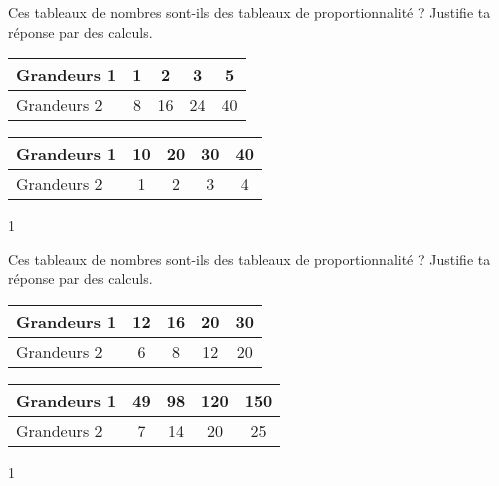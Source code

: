 \documentclass[a4paper,11pt]{report}
\begin{document}
\begin{exo}{
Ces tableaux de nombres sont-ils des tableaux de proportionnalité ? Justifie ta réponse par des calculs.

\begin{tasks}
\task 
\begin{tabular}{|l|c|c|c|c|}\hline
Grandeurs 1 & 1 & 2 & 3 & 5 \\\hline
Grandeurs 2 & 8 & 16 & 24 & 40 \\\hline
\end{tabular}
\task 
\begin{tabular}{|l|c|c|c|c|}\hline
Grandeurs 1 & 10 & 20 & 30 & 40 \\\hline
Grandeurs 2 & 1 &2 & 3 & 4  \\\hline
\end{tabular}
\end{tasks}
\medskip}{1}
\end{exo}

\begin{exo}{
Ces tableaux de nombres sont-ils des tableaux de proportionnalité ? Justifie ta réponse par des calculs.

\begin{tasks}
\task 
\begin{tabular}{|l|c|c|c|c|}\hline
Grandeurs 1 & 12 & 16 & 20 & 30  \\\hline
Grandeurs 2 &6 & 8 & 12 & 20 \\\hline
\end{tabular}
\task 
\begin{tabular}{|l|c|c|c|c|}\hline
Grandeurs 1 & 49 & 98 & 120 & 150 \\\hline
Grandeurs 2 & 7 & 14 & 20 & 25  \\\hline
\end{tabular}
\end{tasks}
\medskip}{1}
\end{exo}
\end{document}
